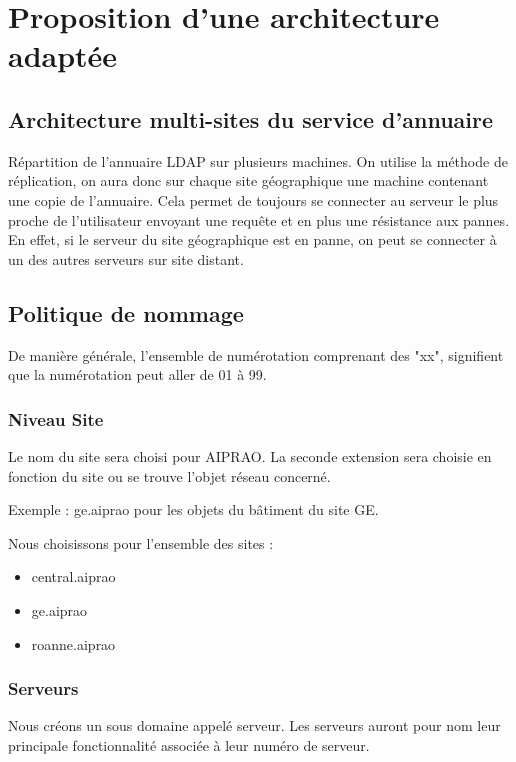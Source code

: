 \section{Proposition d'une architecture adaptée}

\subsection{Architecture multi-sites du service d'annuaire}

Répartition de l'annuaire LDAP sur plusieurs machines. On utilise la méthode de
réplication, on aura donc sur chaque site géographique une machine contenant 
une copie de l'annuaire. Cela permet de toujours se connecter au serveur le 
plus proche de l'utilisateur envoyant une requête et en plus une résistance 
aux pannes. En effet, si le serveur du site géographique est en panne, on peut
se connecter à un des autres serveurs sur site distant.

\subsection{Politique de nommage}

De manière générale, l'ensemble de numérotation comprenant des "xx", signifient 
que la numérotation peut aller de 01 à 99.

\subsubsection{Niveau Site}

Le nom du site sera choisi pour AIPRAO. La seconde extension sera choisie en fonction
du site ou se trouve l'objet réseau concerné. 

Exemple : ge.aiprao pour les objets du bâtiment du site GE. 

Nous choisissons pour l'ensemble des sites : 
\begin{itemize}
\item central.aiprao
\item ge.aiprao
\item roanne.aiprao
\end{itemize}

\subsubsection{Serveurs}

Nous créons un sous domaine appelé serveur. Les serveurs auront pour nom leur 
principale fonctionnalité associée à leur numéro de serveur. 

